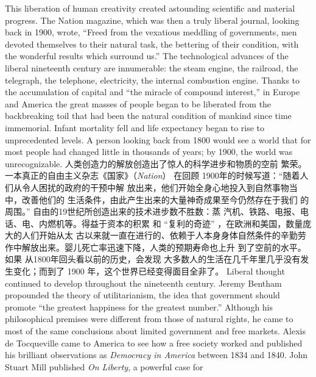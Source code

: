 \begin{paracol}{2}
This liberation of human creativity created astounding scientific and material progress. The Nation magazine, which was
then a truly liberal journal, looking back in 1900, wrote, ``Freed
from the vexatious meddling of governments, men devoted
themselves to their natural task, the bettering of their condition, with the wonderful results which surround us.'' The technological advances of the liberal nineteenth century are
innumerable: the steam engine, the railroad, the telegraph, the
telephone, electricity, the internal combustion engine. Thanks
to the accumulation of capital and ``the miracle of compound
interest,'' in Europe and America the great masses of people
began to be liberated from the backbreaking toil that had been
the natural condition of mankind since time immemorial. Infant mortality fell and life expectancy began to rise to unprecedented levels. A person looking back from 1800 would see a
world that for most people had changed little in thousands of
years; by 1900, the world was unrecognizable.
\switchcolumn
人类创造力的解放创造出了惊人的科学进步和物质的空前
繁荣。一本真正的自由主义杂志《国家》（\textit{Nation}） 在回顾
1900年的时候写道：“随着人们从令人困扰的政府的干预中解
放出来，他们开始全身心地投入到自然事物当中，改善他们的
生活条件，由此产生出来的大量神奇成果至今仍然存在于我们
的周围。” 自由的19世纪所创造出来的技术进步数不胜数：蒸
汽机、铁路、电报、电话、电、内燃机等。得益于资本的积累
和 “复利的奇迹” ，在欧洲和美国，数量庞大的人们开始从太
古以来就一直在进行的、依赖于人本身身体自然条件的辛勤劳
作中解放出来。婴儿死亡率迅速下降，人类的预期寿命也上升
到了空前的水平。如果 从1800年回头看以前的历史，会发现
大多数人的生活在几千年里几乎没有发生变化；而到了 1900
年，这个世界已经变得面目全非了。
\switchcolumn*
Liberal thought continued to develop throughout the nineteenth century. Jeremy Bentham propounded the theory of
utilitarianism, the idea that government should promote ``the
greatest happiness for the greatest number.'' Although his
philosophical premises were different from those of natural
rights, he came to most of the same conclusions about limited
government and free markets. Alexis de Tocqueville came to
America to see how a free society worked and published his brilliant observations as \textit{Democracy in America} between 1834 and
1840. John Stuart Mill published \textit{On Liberty}, a powerful case for

\end{paracol}
